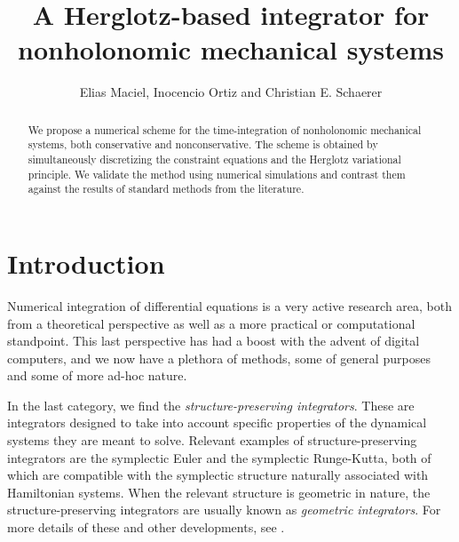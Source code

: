 \documentclass{aims}
\numberwithin{equation}{section}
\theoremstyle{definition}
\begin{document}
\title{A Herglotz-based integrator for nonholonomic mechanical systems}

\author{%
  Elias Maciel,
  Inocencio Ortiz\corrauth
  and
  Christian E. Schaerer
}


\address{%
  }


\begin{abstract}
We propose a numerical scheme for the time-integration of nonholonomic mechanical systems, both conservative and nonconservative. The scheme is obtained by simultaneously discretizing the constraint equations and the Herglotz variational principle. We validate the method using numerical simulations and contrast them against the results of standard methods from the literature.

\end{abstract}


\maketitle

\section{Introduction}

Numerical integration of differential equations is a very active research area, both from a theoretical perspective as well as a more practical or computational standpoint. This last perspective has had a boost with the advent of digital computers, and we now have a plethora of methods, some of general purposes and some of more ad-hoc nature.

In the last category, we find the {\it structure-preserving integrators}. These are integrators designed to take into account specific properties of the dynamical systems they are meant to solve. Relevant examples of structure-preserving integrators are the symplectic Euler and the symplectic Runge-Kutta, both of which are compatible with the symplectic structure naturally associated with Hamiltonian systems. When the relevant structure is geometric in nature, the structure-preserving integrators are usually known as {\it geometric integrators}. For more details of these and other developments, see \cite{hairer2006geometric}.  
\end{document}
